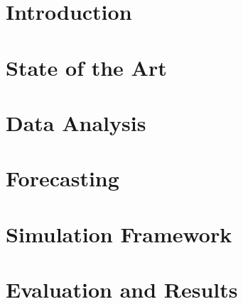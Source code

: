 \documentclass[a4paper,11pt,twoside]{memoir}
\begin{document}


\chapter{Introduction}
\label{ch:intro}



\chapter{State of the Art}
\label{ch:state_of_the_art}



\chapter{Data Analysis}
\label{ch:data_analysis}



\chapter{Forecasting}
\label{ch:forecasting}



\chapter{Simulation Framework}
\label{ch:simulation_framework}



\chapter{Evaluation and Results}
\label{ch:evaluation_and_results}
\end{document}
